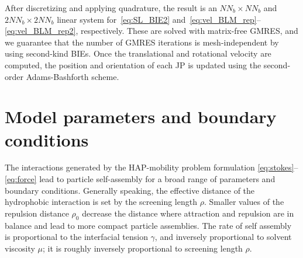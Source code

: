 \documentclass[prb,preprint,showpacs,preprintnumbers,amsmath,amssymb,longbibliography]{revtex4-1}
\renewcommand{\aa}{\mathbf{a}}
\renewcommand{\vv}{\mathbf{v}}
\begin{document}
After discretizing and applying quadrature, the result is an $NN_b
\times NN_b$ and $2NN_b \times 2NN_b$ linear system
for~\eqref{eq:SL_BIE2}
and~\eqref{eq:vel_BLM_rep}--\eqref{eq:vel_BLM_rep2}, respectively.
These are solved with matrix-free GMRES, and we guarantee that the
number of GMRES iterations is mesh-independent by using second-kind
BIEs. Once the translational and rotational velocity are computed, the
position and orientation of each JP is updated using the second-order
Adams-Bashforth scheme.



\section{Model parameters and boundary conditions}
The interactions generated by the HAP-mobility problem formulation
\eqref{eq:stokes}--\eqref{eq:force}
lead to particle self-assembly for a broad range of parameters and
boundary conditions.  Generally speaking, the effective distance of the
hydrophobic interaction is set by the screening length $\rho$.
Smaller values of the repulsion distance $\rho_0$ decrease the distance
where attraction and repulsion are in balance and lead to more compact
particle assemblies. 
The rate of self assembly is proportional to the interfacial tension $\gamma$,
and inversely proportional to solvent viscosity $\mu$; it is
roughly inversely proportional to screening length $\rho.$
\end{document}
